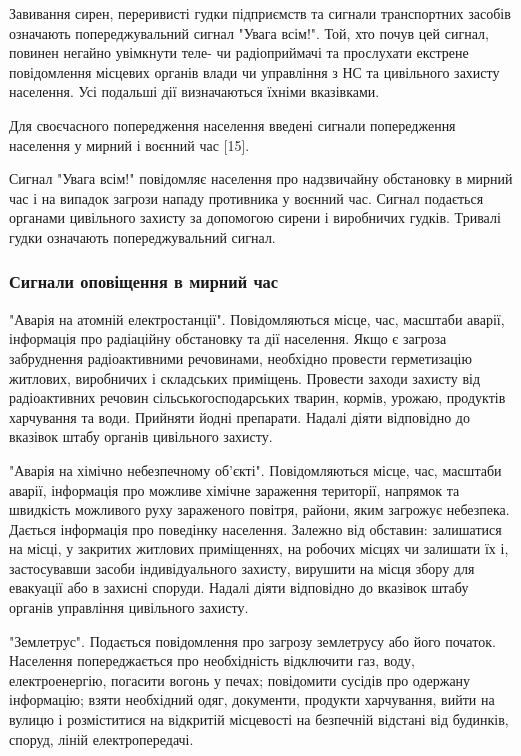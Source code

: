 Завивання сирен, переривисті гудки підприємств та сигнали транспортних засобів означають попереджувальний сигнал "Увага всім!". Той, хто почув цей сигнал, повинен негайно увімкнути теле- чи радіоприймачі та прослухати екстрене повідомлення місцевих органів влади чи управління з НС та цивільного захисту населення. Усі подальші дії визначаються їхніми вказівками.

Для своєчасного попередження населення введені сигнали попередження населення у мирний і воєнний час [15].

Сигнал "Увага всім!" повідомляє населення про надзвичайну обстановку в мирний час і на випадок загрози нападу противника у воєнний час. Сигнал подається органами цивільного захисту за допомогою сирени і виробничих гудків. Тривалі гудки означають попереджувальний сигнал.

\subsubsection{Сигнали оповіщення в мирний час}

"Аварія на атомній електростанції". Повідомляються місце, час, масштаби аварії, інформація про радіаційну обстановку та дії населення. Якщо є загроза забруднення радіоактивними речовинами, необхідно провести герметизацію житлових, виробничих і складських приміщень. Провести заходи захисту від радіоактивних речовин сільськогосподарських тварин, кормів, урожаю, продуктів харчування та води. Прийняти йодні препарати. Надалі діяти відповідно до вказівок штабу органів цивільного захисту.

"Аварія на хімічно небезпечному об'єкті". Повідомляються місце, час, масштаби аварії, інформація про можливе хімічне зараження території, напрямок та швидкість можливого руху зараженого повітря, райони, яким загрожує небезпека. Дається інформація про поведінку населення. Залежно від обставин: залишатися на місці, у закритих житлових приміщеннях, на робочих місцях чи залишати їх і, застосувавши засоби індивідуального захисту, вирушити на місця збору для евакуації або в захисні споруди. Надалі діяти відповідно до вказівок штабу органів управління цивільного захисту.

"Землетрус". Подається повідомлення про загрозу землетрусу або його початок. Населення попереджається про необхідність відключити газ, воду, електроенергію, погасити вогонь у печах; повідомити сусідів про одержану інформацію; взяти необхідний одяг, документи, продукти харчування, вийти на вулицю і розміститися на відкритій місцевості на безпечній відстані від будинків, споруд, ліній електропередачі.


